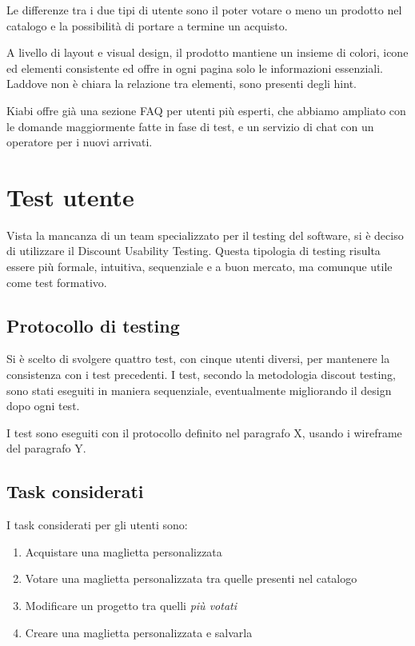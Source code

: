 \documentclass[12pt,italian,]{report}
\providecommand{\tightlist}{%
  \setlength{\itemsep}{0pt}\setlength{\parskip}{0pt}}
\begin{document}
Le differenze tra i due tipi di utente sono il poter votare o meno un
prodotto nel catalogo e la possibilità di portare a termine un acquisto.

A livello di layout e visual design, il prodotto mantiene un insieme di
colori, icone ed elementi consistente ed offre in ogni pagina solo le
informazioni essenziali. Laddove non è chiara la relazione tra elementi,
sono presenti degli hint.

Kiabi offre già una sezione FAQ per utenti più esperti, che abbiamo
ampliato con le domande maggiormente fatte in fase di test, e un
servizio di chat con un operatore per i nuovi arrivati.

\hypertarget{test-utente}{%
\section{Test utente}\label{test-utente}}

Vista la mancanza di un team specializzato per il testing del software,
si è deciso di utilizzare il Discount Usability Testing. Questa
tipologia di testing risulta essere più formale, intuitiva, sequenziale
e a buon mercato, ma comunque utile come test formativo.

\hypertarget{protocollo-di-testing-1}{%
\subsection{Protocollo di testing}\label{protocollo-di-testing-1}}

Si è scelto di svolgere quattro test, con cinque utenti diversi, per
mantenere la consistenza con i test precedenti. I test, secondo la
metodologia discout testing​, sono stati eseguiti in maniera
sequenziale, eventualmente migliorando il design dopo ogni test.

I test sono eseguiti con il protocollo definito nel paragrafo X, usando
i wireframe del paragrafo Y.

\hypertarget{task-considerati}{%
\subsection{Task considerati}\label{task-considerati}}

I task considerati per gli utenti sono:

\begin{enumerate}
\def\labelenumi{\arabic{enumi}.}
\tightlist
\item
  Acquistare una maglietta personalizzata
\item
  Votare una maglietta personalizzata tra quelle presenti nel catalogo
\item
  Modificare un progetto tra quelli \emph{più votati}
\item
  Creare una maglietta personalizzata e salvarla
\end{enumerate}
\end{document}
